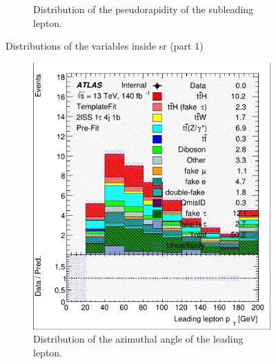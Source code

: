 \begin{figure}[htb!]
\begin{subfigure}{0.45\textwidth}
        \caption{Distribution of the pseudorapidity of the subleading lepton.}
        \label{fig:lep_Eta_1}
    \end{subfigure}
    \caption{Distributions of the variables inside \gls{sr} (part 1)}
    \label{fig:distributions1}
\end{figure}

\newpage

\begin{figure}[htb!]
    \centering
    \begin{subfigure}{0.45\textwidth}
        \includegraphics[width=\linewidth]{figures/plots/histograms/lep_Phi_0.png}
        \caption{Distribution of the azimuthal angle of the leading lepton.}
        \label{fig:lep_Phi_0}
    \end{subfigure}\hfill%
    \begin{subfigure}{0.45\textwidth}

\end{subfigure}
\end{figure}
